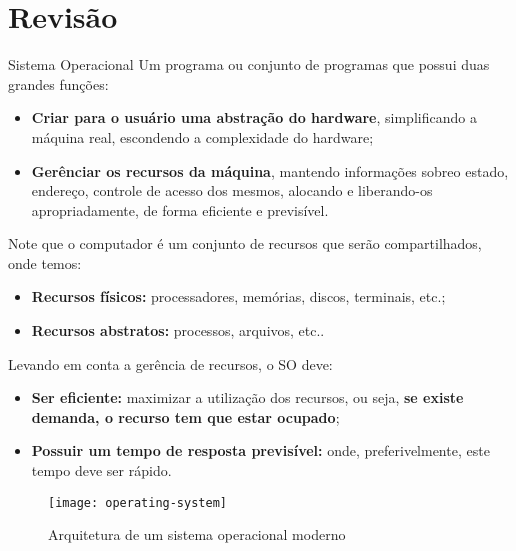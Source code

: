 \chapter{Revisão}

\begin{definicao}{Sistema Operacional}
  Um programa ou conjunto de programas que possui duas grandes funções:
  \begin{itemize}
    \item \textbf{Criar para o usuário uma abstração do hardware}, simplificando a máquina real, escondendo a complexidade do hardware;

    \item \textbf{Gerênciar os recursos da máquina}, mantendo informações sobreo estado, endereço, controle de acesso dos mesmos, alocando e liberando-os apropriadamente, de forma eficiente e previsível.
  \end{itemize}
\end{definicao}

Note que o computador é um conjunto de recursos que serão compartilhados, onde temos:
\begin{itemize}
  \item \textbf{Recursos físicos:} processadores, memórias, discos, terminais, etc.;

  \item \textbf{Recursos abstratos:} processos, arquivos, etc..
\end{itemize}

Levando em conta a gerência de recursos, o SO deve:
\begin{itemize}
  \item \textbf{Ser eficiente:} maximizar a utilização dos recursos, ou seja, \textbf{se existe demanda, o recurso tem que estar ocupado};

  \item \textbf{Possuir um tempo de resposta previsível:} onde, preferivelmente, este tempo deve ser rápido.
\end{itemize}

\begin{figure}[h]
  \centering
  \texttt{[image: operating-system]}
  \caption{Arquitetura de um sistema operacional moderno}
  \label{fig:operating-system}
\end{figure}














